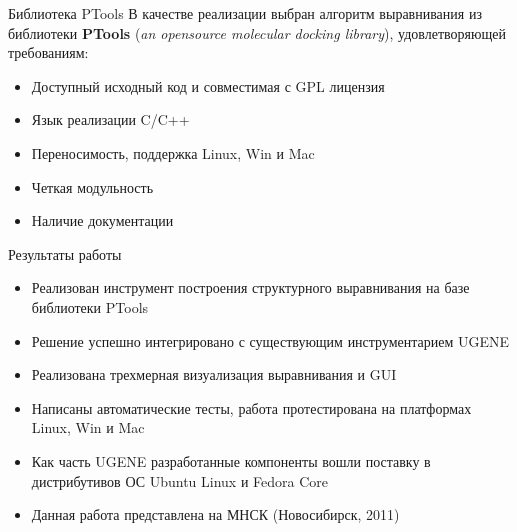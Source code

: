 \documentclass[utf8, professionalfonts]{beamer}
\begin{document}
\begin{frame}{Библиотека PTools}
    В качестве реализации выбран алгоритм выравнивания из библиотеки {\bf PTools} ({\it an opensource molecular docking library}), удовлетворяющей требованиям:
    \begin{itemize}
        \item Доступный исходный код и совместимая с GPL лицензия
        \item Язык реализации C/C++
        \item Переносимость, поддержка Linux, Win и Mac
        \item Четкая модульность
        \item Наличие документации
    \end{itemize}
\end{frame}


\begin{frame}{Результаты работы}
\begin{small}
\begin{itemize}
    \item Реализован инструмент построения структурного выравнивания на базе библиотеки PTools
    \item Решение успешно интегрировано с существующим инструментарием UGENE
    \item Реализована трехмерная визуализация выравнивания и GUI
    \item Написаны автоматические тесты, работа протестирована на платформах Linux, Win и Mac
    \item Как часть UGENE разработанные компоненты вошли поставку в дистрибутивов ОС Ubuntu Linux и Fedora Core
    \item Данная работа представлена на МНСК (Новосибирск, 2011)

\end{itemize}
\end{small}
\end{frame}
\end{document}
